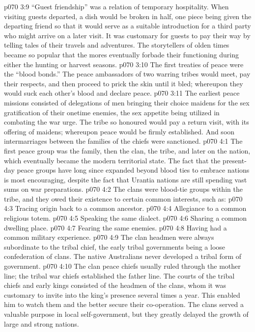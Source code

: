 \vs p070 3:9 “Guest friendship” was a relation of temporary hospitality. When visiting guests departed, a dish would be broken in half, one piece being given the departing friend so that it would serve as a suitable introduction for a third party who might arrive on a later visit. It was customary for guests to pay their way by telling tales of their travels and adventures. The storytellers of olden times became so popular that the mores eventually forbade their functioning during either the hunting or harvest seasons.
\vs p070 3:10 The first treaties of peace were the “blood bonds.” The peace ambassadors of two warring tribes would meet, pay their respects, and then proceed to prick the skin until it bled; whereupon they would suck each other’s blood and declare peace.
\vs p070 3:11 The earliest peace missions consisted of delegations of men bringing their choice maidens for the sex gratification of their onetime enemies, the sex appetite being utilized in combating the war urge. The tribe so honoured would pay a return visit, with its offering of maidens; whereupon peace would be firmly established. And soon intermarriages between the families of the chiefs were sanctioned.
\vs p070 4:1 The first peace group was the family, then the clan, the tribe, and later on the nation, which eventually became the modern territorial state. The fact that the present\hyp{}day peace groups have long since expanded beyond blood ties to embrace nations is most encouraging, despite the fact that Urantia nations are still spending vast sums on war preparations.
\vs p070 4:2 The clans were blood\hyp{}tie groups within the tribe, and they owed their existence to certain common interests, such as:
\vs p070 4:3 \bibnobreakspace Tracing origin back to a common ancestor.
\vs p070 4:4 \bibnobreakspace Allegiance to a common religious totem.
\vs p070 4:5 \bibnobreakspace Speaking the same dialect.
\vs p070 4:6 \bibnobreakspace Sharing a common dwelling place.
\vs p070 4:7 \bibnobreakspace Fearing the same enemies.
\vs p070 4:8 \bibnobreakspace Having had a common military experience.
\vs p070 4:9 \pc The clan headmen were always subordinate to the tribal chief, the early tribal governments being a loose confederation of clans. The native Australians never developed a tribal form of government.
\vs p070 4:10 The clan peace chiefs usually ruled through the mother line; the tribal war chiefs established the father line. The courts of the tribal chiefs and early kings consisted of the headmen of the clans, whom it was customary to invite into the king’s presence several times a year. This enabled him to watch them and the better secure their co\hyp{}operation. The clans served a valuable purpose in local self\hyp{}government, but they greatly delayed the growth of large and strong nations.
